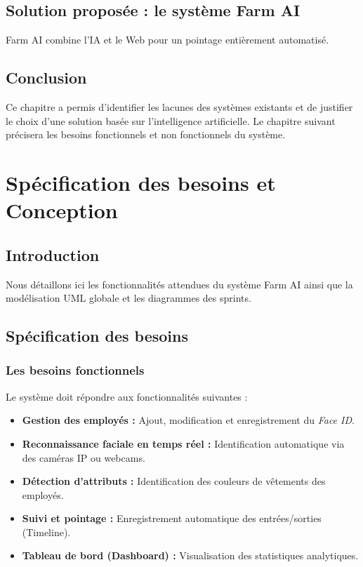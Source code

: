 \documentclass[12pt,a4paper]{report}
\begin{document}
\section{Solution proposée : le système Farm AI}
Farm AI combine l'IA et le Web pour un pointage entièrement automatisé.

\section{Conclusion}
Ce chapitre a permis d'identifier les lacunes des systèmes existants et de justifier le choix d'une
solution basée sur l'intelligence artificielle. Le chapitre suivant précisera les besoins fonctionnels
et non fonctionnels du système.

\chapter{Spécification des besoins et Conception}

\section{Introduction}
Nous détaillons ici les fonctionnalités attendues du système Farm AI ainsi que la modélisation UML globale et les diagrammes des sprints.

\section{Spécification des besoins}

\subsection{Les besoins fonctionnels}
Le système doit répondre aux fonctionnalités suivantes :
\begin{itemize}
  \item \textbf{Gestion des employés :} Ajout, modification et enregistrement du \textit{Face ID}.
  \item \textbf{Reconnaissance faciale en temps réel :} Identification automatique via des caméras IP ou webcams.
  \item \textbf{Détection d'attributs :} Identification des couleurs de vêtements des employés.
  \item \textbf{Suivi et pointage :} Enregistrement automatique des entrées/sorties (Timeline).
  \item \textbf{Tableau de bord (Dashboard) :} Visualisation des statistiques analytiques.
\end{itemize}
\end{document}
